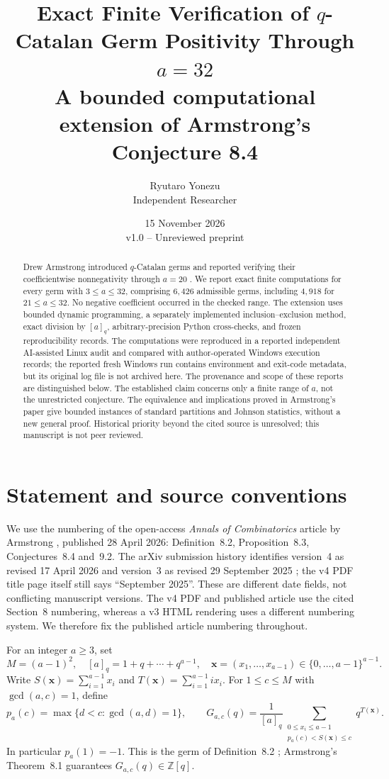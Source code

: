 \documentclass[11pt,a4paper]{article}
\title{\textbf{Exact Finite Verification of $q$-Catalan Germ Positivity Through $a=32$}\\[.3em]
\large A bounded computational extension of Armstrong's Conjecture 8.4}
\author{Ryutaro Yonezu\\\small Independent Researcher}
\date{15 November 2026\\\small v1.0 -- Unreviewed preprint}
\newcommand{\ZZ}{\mathbb{Z}}
\begin{document}
\maketitle
\begin{abstract}
Drew Armstrong introduced $q$-Catalan germs and reported verifying their coefficientwise nonnegativity through $a=20$ \cite{Armstrong2026}. We report exact finite computations for every germ with $3\le a\le32$, comprising $6{,}426$ admissible germs, including $4{,}918$ for $21\le a\le32$. No negative coefficient occurred in the checked range. The extension uses bounded dynamic programming, a separately implemented inclusion--exclusion method, exact division by $[a]_q$, arbitrary-precision Python cross-checks, and frozen reproducibility records. The computations were reproduced in a reported independent AI-assisted Linux audit and compared with author-operated Windows execution records; the reported fresh Windows run contains environment and exit-code metadata, but its original log file is not archived here. The provenance and scope of these reports are distinguished below. The established claim concerns only a finite range of $a$, not the unrestricted conjecture. The equivalence and implications proved in Armstrong's paper give bounded instances of standard partitions and Johnson statistics, without a new general proof. Historical priority beyond the cited source is unresolved; this manuscript is not peer reviewed.
\end{abstract}

\section{Statement and source conventions}
We use the numbering of the open-access \emph{Annals of Combinatorics} article by Armstrong \cite{Armstrong2026}, published 28 April 2026: Definition~8.2, Proposition~8.3, Conjectures~8.4 and~9.2. The arXiv submission history identifies version~4 as revised 17 April 2026 and version~3 as revised 29 September 2025 \cite{ArmstrongArxivV4}; the v4 PDF title page itself still says ``September 2025''. These are different date fields, not conflicting manuscript versions. The v4 PDF and published article use the cited Section~8 numbering, whereas a v3 HTML rendering uses a different numbering system. We therefore fix the published article numbering throughout.

For an integer $a\ge3$, set
\[
M=(a-1)^2,\quad [a]_q=1+q+\cdots+q^{a-1},\quad
\mathbf{x}=(x_1,\ldots,x_{a-1})\in\{0,\ldots,a-1\}^{a-1}.
\]
Write $S(\mathbf{x})=\sum_{i=1}^{a-1}x_i$ and $T(\mathbf{x})=\sum_{i=1}^{a-1}ix_i$. For $1\le c\le M$ with $\gcd(a,c)=1$, define
\[
p_a(c)=\max\{d<c:\gcd(a,d)=1\},\qquad
G_{a,c}(q)=\frac{1}{[a]_q}
\sum_{\substack{0\le x_i\le a-1\\p_a(c)<S(\mathbf{x})\le c}}q^{T(\mathbf{x})}.
\tag{1}\label{eq:germ}
\]
In particular $p_a(1)=-1$. This is the germ of Definition~8.2 \cite{Armstrong2026}; Armstrong's Theorem~8.1 guarantees $G_{a,c}(q)\in\ZZ[q]$.
\end{document}
